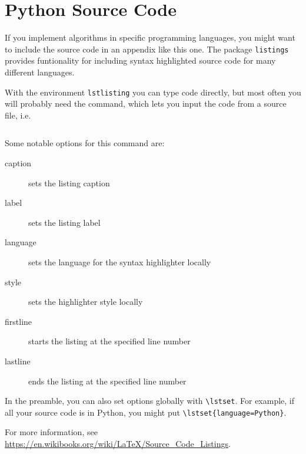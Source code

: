 
\chapter{Python Source Code}
\label{app:code}

If you implement algorithms in specific programming languages, you might want to include the source code in an appendix like this one.
The package \texttt{listings} provides funtionality for including syntax highlighted source code for many different languages.

With the environment \texttt{lstlisting} you can type code directly, but most often you will probably need the \verb!! command, which lets you input the code from a source file, i.e.
%
\begin{verbatim}

\end{verbatim}
%
Some notable options for this command are:
%
\begin{description}
\item[caption] sets the listing caption
\item[label] sets the listing label
\item[language] sets the language for the syntax highlighter locally
\item[style] sets the highlighter style locally
\item[firstline] starts the listing at the specified line number
\item[lastline] ends the listing at the specified line number
\end{description}
%
In the preamble, you can also set options globally with \verb!\lstset!.
For example, if all your source code is in Python, you might put \verb!\lstset{language=Python}!.



For more information, see \url{https://en.wikibooks.org/wiki/LaTeX/Source_Code_Listings}.
